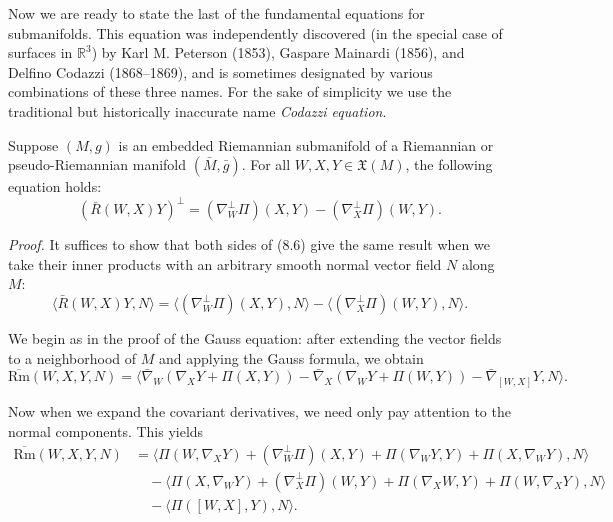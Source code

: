 Now we are ready to state the last of the fundamental equations for submanifolds. This equation was independently discovered (in the special case of surfaces in $\mathbb{R}^3$) by Karl M. Peterson (1853), Gaspare Mainardi (1856), and Delfino Codazzi (1868--1869), and is sometimes designated by various combinations of these three names. For the sake of simplicity we use the traditional but historically inaccurate name \emph{Codazzi equation}.

\begin{theorem}
\label{thm:codazzi-equation}

Suppose $(M, g)$ is an embedded Riemannian submanifold of a Riemannian or pseudo-Riemannian manifold $(\bar{M}, \bar{g})$. For all $W, X, Y \in \mathfrak{X}(M)$, the following equation holds:
\begin{equation}
(\bar{R}(W, X)Y)^{\perp} = (\nabla_W^{\perp} \Pi)(X, Y) - (\nabla_X^{\perp} \Pi)(W, Y).
\tag{8.6}
\end{equation}
\end{theorem}

\emph{Proof.} It suffices to show that both sides of (8.6) give the same result when we take their inner products with an arbitrary smooth normal vector field $N$ along $M$:
\begin{equation}
\langle \bar{R}(W, X)Y, N \rangle = \langle (\nabla_W^{\perp} \Pi)(X, Y), N \rangle - \langle (\nabla_X^{\perp} \Pi)(W, Y), N \rangle.
\tag{8.7}
\end{equation}

We begin as in the proof of the Gauss equation: after extending the vector fields to a neighborhood of $M$ and applying the Gauss formula, we obtain
\[
\overline{\text{Rm}}(W, X, Y, N) = \langle \bar{\nabla}_W (\nabla_X Y + \Pi(X, Y)) - \bar{\nabla}_X (\nabla_W Y + \Pi(W, Y)) - \bar{\nabla}_{[W,X]} Y, N \rangle.
\]

Now when we expand the covariant derivatives, we need only pay attention to the normal components. This yields
\begin{align*}
\overline{\text{Rm}}(W, X, Y, N) &= \langle \Pi(W, \nabla_X Y) + (\nabla_W^{\perp} \Pi)(X, Y) + \Pi(\nabla_W Y, Y) + \Pi(X, \nabla_W Y), N \rangle \\
&\quad - \langle \Pi(X, \nabla_W Y) + (\nabla_X^{\perp} \Pi)(W, Y) + \Pi(\nabla_X W, Y) + \Pi(W, \nabla_X Y), N \rangle \\
&\quad - \langle \Pi([W, X], Y), N \rangle.
\end{align*}

